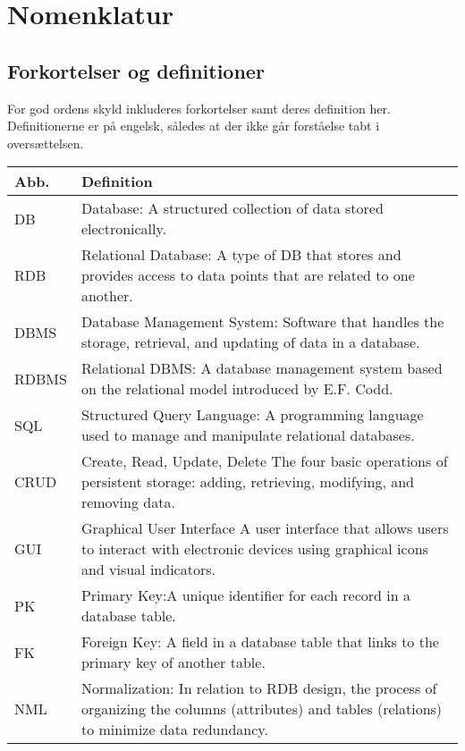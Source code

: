 \chapter{Nomenklatur}

\section{Forkortelser og definitioner}
For god ordens skyld inkluderes forkortelser samt deres definition her. Definitionerne er på engelsk, således at der ikke går forståelse tabt i oversættelsen.

\renewcommand{\arraystretch}{2}
\begin{longtable}{l p{13.5cm}}
    \textbf{Abb.}  & \textbf{Definition}  \\ \hline
        DB           & Database: A structured collection of data stored electronically. \\ \hline
        RDB          & Relational Database: A type of DB that stores and provides access to data points that are related to one another. \\ \hline
        DBMS         & Database Management System: Software that handles the storage, retrieval, and updating of data in a database. \\ \hline
        RDBMS        & Relational DBMS: A database management system based on the relational model introduced by E.F. Codd. \\ \hline
        SQL          & Structured Query Language: A programming language used to manage and manipulate relational databases. \\ \hline
        CRUD         & Create, Read, Update, Delete The four basic operations of persistent storage: adding, retrieving, modifying, and removing data. \\ \hline
        GUI          & Graphical User Interface  A user interface that allows users to interact with electronic devices using graphical icons and visual indicators. \\ \hline
        PK           & Primary Key:A unique identifier for each record in a database table. \\ \hline
        FK           & Foreign Key: A field in a database table that links to the primary key of another table. \\ \hline
        NML          & Normalization: In relation to RDB design, the process of organizing the columns (attributes) and tables (relations) to minimize data redundancy. \\ \hline

\end{longtable}
